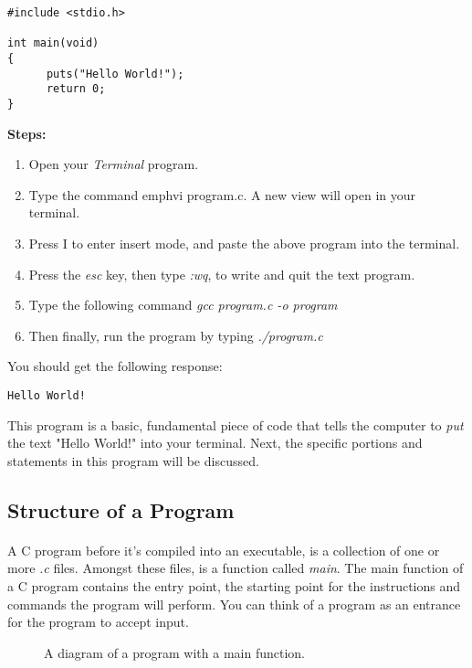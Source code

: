 \begin{lstlisting}[style = customc]
#include <stdio.h>

int main(void)
{
      puts("Hello World!");
      return 0;
}

\end{lstlisting}

\textbf{Steps:}
\begin{enumerate}
\item Open your \textit{Terminal} program.
\item Type the command emph{vi program.c}. A new view will open in your terminal.
\item Press I to enter insert mode, and paste the above program into the terminal.
\item Press the \textit{esc} key, then type \emph{:wq}, to write and quit the text program.
\item Type the following command \emph{gcc program.c -o program}
\item Then finally, run the program by typing \emph{./program.c}
\end{enumerate}

You should get the following response: \\


\begin{lstlisting}[style = customc]
Hello World!
\end{lstlisting}

This program is a basic, fundamental piece of code that tells the computer to \textit{put} the text "Hello World!" into your terminal. Next, the specific portions and statements in this program will be discussed.

\subsection{Structure of a Program}

\paragraph{   } A C program before it's compiled into an executable, is a collection of one or more \emph{.c} files. Amongst these files, is a function called \textit{main}. The main function of a C program contains the entry point, the starting point for the instructions and commands the program will perform. You can think of a program as an entrance for the program to accept input. 

\begin{figure}[h]
\begin{center}
\end{center}
\caption{ A diagram of a program with a main function.}
\end{figure}

